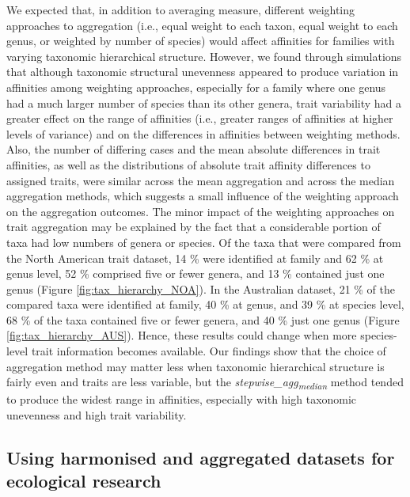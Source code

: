 \documentclass{article}
\begin{document}
We expected that, in addition to averaging measure, different weighting approaches to aggregation (i.e., equal weight to each taxon, equal weight to each genus, or weighted by number of species) would affect affinities for families with varying taxonomic hierarchical structure. However, we found through simulations that although taxonomic structural unevenness appeared to produce variation in affinities among weighting approaches, especially for a family where one genus had a much larger number of species than its other genera, trait variability had a greater effect on the range of affinities (i.e., greater ranges of affinities at higher levels of variance) and on the differences in affinities between weighting methods. Also, the number of differing cases and the mean absolute differences in trait affinities, as well as the distributions of absolute trait affinity differences to assigned traits, were similar across the mean aggregation and across the median aggregation methods, which suggests a small influence of the weighting approach on the aggregation outcomes. The minor impact of the weighting approaches on trait aggregation may be explained by the fact that a considerable portion of taxa had low numbers of genera or species. Of the taxa that were compared from the North American trait dataset, 14 \% were identified at family and 62 \% at genus level, 52 \% comprised five or fewer genera, and 13 \% contained just one genus (Figure \ref{fig:tax_hierarchy_NOA}). In the Australian dataset, 21 \% of the compared taxa were identified at family, 40 \% at genus, and 39 \% at species level, 68 \% of the taxa contained five or fewer genera, and 40 \% just one genus (Figure \ref{fig:tax_hierarchy_AUS}). Hence, these results could change when more species-level trait information becomes available. Our findings show that the choice of aggregation method may matter less when taxonomic hierarchical structure is fairly even and traits are less variable, but the \textit{stepwise\_agg\textsubscript{median}} method tended to produce the widest range in affinities, especially with high taxonomic unevenness and high trait variability. 

\subsection*{Using harmonised and aggregated datasets for ecological research}
\end{document}
